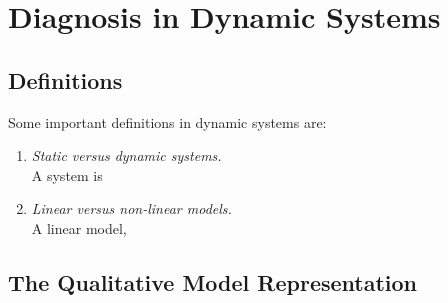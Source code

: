 \chapter{Diagnosis in Dynamic Systems}
\label{app2:diadynsys}


\section {Definitions}
\label{app2:SysDefinitions}

Some important definitions in dynamic systems are:
\begin{enumerate}
\item \emph{Static versus dynamic systems.} \\  A system is \item
\emph{Linear versus non-linear models.} \\ A linear model,
\end{enumerate}

\section {The Qualitative Model Representation}
\label{app2:quarea}

\newpage
